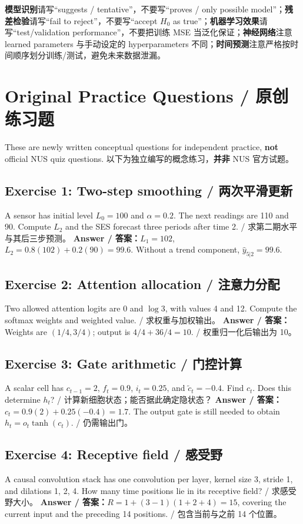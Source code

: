 \documentclass[UTF8,fontset=fandol,10.5pt,a4paper]{ctexart}
\begin{document}
\begin{pitbox}[title={阅卷视角：这些表述能避免失分}]
\textbf{模型识别}请写“suggests / tentative”，不要写“proves / only possible model”；\textbf{残差检验}请写“fail to reject”，不要写“accept $H_0$ as true”；\textbf{机器学习效果}请写“test/validation performance”，不要把训练 MSE 当泛化保证；\textbf{神经网络}注意 learned parameters 与手动设定的 hyperparameters 不同；\textbf{时间预测}注意严格按时间顺序划分训练/测试，避免未来数据泄漏。
\end{pitbox}

\clearpage
\section{Original Practice Questions / 原创练习题}
\begin{keybox}[title={Independent exercises / 独立编写练习}]
These are newly written conceptual questions for independent practice, \textbf{not} official NUS quiz questions. 以下为独立编写的概念练习，\textbf{并非} NUS 官方试题。
\end{keybox}
\subsection*{Exercise 1: Two-step smoothing / 两次平滑更新}
A sensor has initial level $L_0=100$ and $\alpha=0.2$. The next readings are 110 and 90. Compute $L_2$ and the SES forecast three periods after time 2. / 求第二期水平与其后三步预测。
\textbf{Answer / 答案：}$L_1=102$, $L_2=0.8(102)+0.2(90)=99.6$. Without a trend component, $\hat y_{5|2}=99.6$.
\subsection*{Exercise 2: Attention allocation / 注意力分配}
Two allowed attention logits are $0$ and $\log 3$, with values 4 and 12. Compute the softmax weights and weighted value. / 求权重与加权输出。
\textbf{Answer / 答案：}Weights are $(1/4,3/4)$; output is $4/4+36/4=10$. / 权重归一化后输出为 10。
\subsection*{Exercise 3: Gate arithmetic / 门控计算}
A scalar cell has $c_{t-1}=2$, $f_t=0.9$, $i_t=0.25$, and $\tilde c_t=-0.4$. Find $c_t$. Does this determine $h_t$? / 计算新细胞状态；能否据此确定隐状态？
\textbf{Answer / 答案：}$c_t=0.9(2)+0.25(-0.4)=1.7$. The output gate is still needed to obtain $h_t=o_t\tanh(c_t)$. / 仍需输出门。
\subsection*{Exercise 4: Receptive field / 感受野}
A causal convolution stack has one convolution per layer, kernel size 3, stride 1, and dilations 1, 2, 4. How many time positions lie in its receptive field? / 求感受野大小。
\textbf{Answer / 答案：}$R=1+(3-1)(1+2+4)=15$, covering the current input and the preceding 14 positions. / 包含当前与之前 14 个位置。
\end{document}
